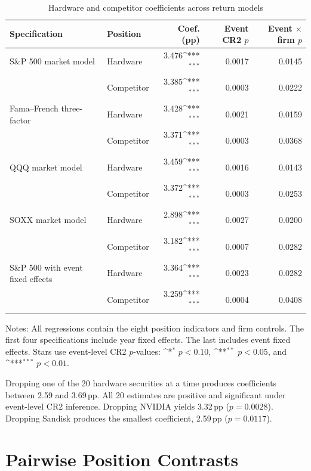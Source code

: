 \documentclass[12pt]{article}
\newcommand{\pp}{\,pp}
\newcommand{\sym}[1]{\ifmmode^{#1}\else\(^{#1}\)\fi}
\begin{document}
\begin{table}[H]
\centering
\begin{threeparttable}
\caption{Hardware and competitor coefficients across return models}
\label{tab:a2}
\small
\setlength{\tabcolsep}{4pt}
\begin{tabular}{llrrr}
\toprule
Specification & Position & Coef. (pp) & Event CR2 $p$ &
Event $\times$ firm $p$ \\
\midrule
S\&P 500 market model
 & Hardware   & 3.476\sym{***} & 0.0017 & 0.0145 \\
 & Competitor & 3.385\sym{***} & 0.0003 & 0.0222 \\
\addlinespace
Fama--French three-factor
 & Hardware   & 3.428\sym{***} & 0.0021 & 0.0159 \\
 & Competitor & 3.371\sym{***} & 0.0003 & 0.0368 \\
\addlinespace
QQQ market model
 & Hardware   & 3.459\sym{***} & 0.0016 & 0.0143 \\
 & Competitor & 3.372\sym{***} & 0.0003 & 0.0253 \\
\addlinespace
SOXX market model
 & Hardware   & 2.898\sym{***} & 0.0027 & 0.0200 \\
 & Competitor & 3.182\sym{***} & 0.0007 & 0.0282 \\
\addlinespace
S\&P 500 with event fixed effects
 & Hardware   & 3.364\sym{***} & 0.0023 & 0.0282 \\
 & Competitor & 3.259\sym{***} & 0.0004 & 0.0408 \\
\bottomrule
\end{tabular}
\begin{tablenotes}\footnotesize
\item Notes: All regressions contain the eight position indicators and firm
controls. The first four specifications include year fixed effects. The
last includes event fixed effects.
Stars use event-level CR2 $p$-values:
\sym{*} $p<0.10$, \sym{**} $p<0.05$, and \sym{***} $p<0.01$.
\end{tablenotes}
\end{threeparttable}
\end{table}

Dropping one of the 20 hardware securities at a time produces coefficients
between 2.59 and 3.69\pp{}. All 20 estimates are positive and significant
under event-level CR2 inference. Dropping NVIDIA yields 3.32\pp{}
($p=0.0028$). Dropping Sandisk produces the smallest coefficient,
2.59\pp{} ($p=0.0117$).

\section{Pairwise Position Contrasts}
\end{document}
